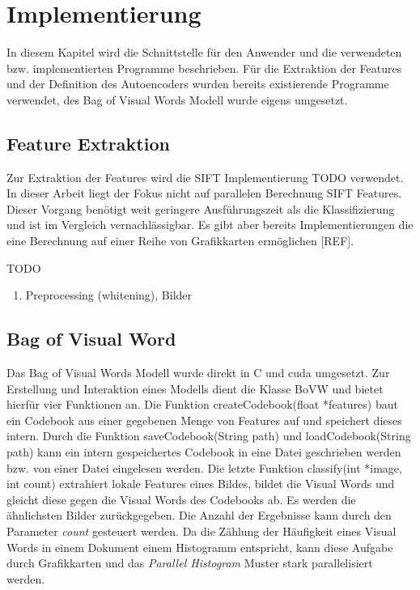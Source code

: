 \chapter{Implementierung}

In diesem Kapitel wird die Schnittstelle für den Anwender und die verwendeten bzw. implementierten Programme beschrieben. Für die Extraktion der Features und der Definition des Autoencoders wurden bereits existierende Programme verwendet, des Bag of Visual Words Modell wurde eigens umgesetzt.

\section{Feature Extraktion}

Zur Extraktion der Features wird die SIFT Implementierung TODO verwendet. In dieser Arbeit liegt der Fokus nicht auf parallelen Berechnung SIFT Features. Dieser Vorgang benötigt weit geringere Ausführungszeit als die Klassifizierung und ist im Vergleich vernachlässigbar. Es gibt aber bereits Implementierungen die eine Berechnung auf einer Reihe von Grafikkarten ermöglichen [REF].

TODO

\begin{enumerate}
	\item Preprocessing (whitening), Bilder
\end{enumerate}

\section{Bag of Visual Word}

Das Bag of Visual Words Modell wurde direkt in C und cuda umgesetzt. Zur Erstellung und Interaktion eines Modells dient die Klasse BoVW und bietet hierfür vier Funktionen an. Die Funktion createCodebook(float *features) baut ein Codebook aus einer gegebenen  Menge von Features auf und speichert dieses intern. Durch die Funktion saveCodebook(String path) und loadCodebook(String path) kann ein intern gespeichertes Codebook in eine Datei geschrieben werden bzw. von einer Datei eingelesen werden. Die letzte Funktion classify(int *image, int count) extrahiert lokale Features eines Bildes, bildet die Visual Words und gleicht diese gegen die Visual Words des Codebooks ab. Es werden die ähnlichsten Bilder zurückgegeben. Die Anzahl der Ergebnisse kann durch den Parameter \textit{count} gesteuert werden. Da die Zählung der Häufigkeit eines Visual Words in einem Dokument einem Histogramm entspricht, kann diese Aufgabe durch Grafikkarten und das \textit{Parallel Histogram} Muster stark parallelisiert werden. 

